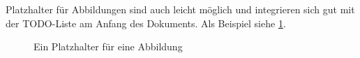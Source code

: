 Platzhalter für Abbildungen sind auch leicht möglich und integrieren sich gut mit der TODO-Liste am Anfang des Dokuments. Als Beispiel siehe
\cref{fig:missing}.

\begin{figure}
    \centering
    \caption{Ein Platzhalter für eine Abbildung}
    \label{fig:missing}
\end{figure}

